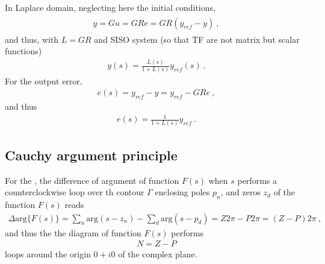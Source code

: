 \documentclass[letterpaper,10pt,english]{jupyterBook}
\begin{document}
\sphinxAtStartPar
In Laplace domain, neglecting here the initial conditions,
\begin{equation*}
\begin{split}\begin{aligned}
  y = G u = G R e = G R ( y_{ref} - y ) \ ,
\end{aligned}\end{split}
\end{equation*}
\sphinxAtStartPar
and thus, with \(L = G R\) and SISO system (so that TF are not matrix but scalar functions)
\begin{equation*}
\begin{split}y(s) = \frac{L(s)}{1 + L(s)} y_{ref}(s) \ .\end{split}
\end{equation*}
\sphinxAtStartPar
For the output error,
\begin{equation*}
\begin{split}e(s) = y_{ref} - y = y_{ref} - G R e \ ,\end{split}
\end{equation*}
\sphinxAtStartPar
and thus
\begin{equation*}
\begin{split}e(s) = \frac{1}{1 + L(s)} y_{ref} \ .\end{split}
\end{equation*}

\subsection{Cauchy argument principle}
\label{\detokenize{ch/control/frequency-domain:cauchy-argument-principle}}\label{\detokenize{ch/control/frequency-domain:control-frequency-siso-cauchy-argument}}
\sphinxAtStartPar
For the {\hyperref[\detokenize{ch/complex/analysis:complex-analysis-mero-fun-cauchy-argument-principle}]{}}, the difference of argument of function \(F(s)\) when \(s\) performs a counter\sphinxhyphen{}clockwise loop over th contour \(\Gamma\) enclosing poles \(p_n\), and zeros \(z_d\) of the function \(F(s)\) reads
\begin{equation*}
\begin{split}\Delta \text{arg} \{ F(s) \} = \sum_{n} \text{arg}(s - z_n) - \sum_{d} \text{arg}(s-p_d) = Z 2 \pi - P 2 \pi = (Z-P) 2 \pi \ , \end{split}
\end{equation*}
\sphinxAtStartPar
and thus the the diagram of function \(F(s)\) performs
\begin{equation}\label{equation:ch/control/frequency-domain:eq:cauchy-arg-principle}
\begin{split}N =  Z - P\end{split}
\end{equation}
\sphinxAtStartPar
loops around the origin \(0+i 0\) of the complex plane.
\end{document}
